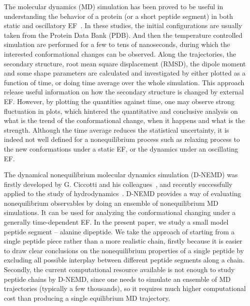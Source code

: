 \documentclass[a4paper,preprint,unsortedaddress,onecolumn]{revtex4-1}
\begin{document}
The molecular dynamics (MD) simulation has been proved to be useful in
understanding the behavior of a protein (or a short peptide segment)
in both static and oscillatory EF~\cite{budi2005electric, budi2007effect, budi2008comparative,
  toschi2008effects, astrakas2011electric, astrakas2012structural,
  damm2012can, starzyk2013proteins, english2009nonequilibrium,
  solomentsev2012effects}. In these studies, the initial
configurations are usually taken from the Protein Data Bank (PDB).
And then the temperature controlled simulation are performed for 
a few to tens of nanoseconds, during which the interested
conformational changes can be observed. Along the trajectories, the
secondary structure, root mean square displacement (RMSD), the dipole
moment and some shape parameters are calculated and investigated by
either plotted as a function of time, or doing time average over the
whole simulation. This approach release useful information on how the
secondary structure is changed by external  EF.  However,
by plotting the quantities against time, one may observe strong
fluctuation in plots, which hintered the quantitative and conclusive
analysis on what is the trend of the conformational change, when
it happens and what is the strength.
Although the time average reduces the statistical uncertainty,
it is indeed not well defined for a nonequilibrium process
such as relaxing process to the new conformations under a static
EF, or the dynamics under an oscillating EF.

The dynamical nonequilibrium molecular dynamics simulation (D-NEMD)
was firstly developed by G. Ciccotti and his
colleagues~\cite{ciccotti1975direct, ciccotti1979thought}, and
recently successfully applied to the study of
hydrodynamics~\cite{orlandini2011hydrodynamics,
  orlandini2011hydrodynamics-01}. D-NEMD provides a way of evaluating
nonequilibrium observables by doing an ensemble of nonequilibrium MD
simulations.  It can be used for analyzing the
conformational changing under a generally time-dependent EF.
In the present paper, we study a small model peptide
segment -- alanine dipeptide. We take the approach of starting from a
single peptide piece rather than a more realistic chain, firstly because it
is easier to draw clear conclusions on the nonequilibrium properties
of a single peptide by excluding all possible interplay between
different peptide segments along a chain.
Secondly, the current computational resource available is not enough
to study peptide chains by D-NEMD, since one needs to simulate an
ensemble of MD trajectories (typically a few thousands), so it
requires much higher computational cost than producing a single
equilibrium MD trajectory.
\end{document}

